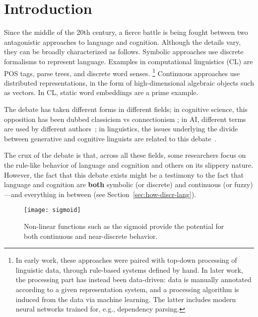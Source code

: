 \section{Introduction}

Since the middle of the 20th century, a fierce battle is being fought between two antagonistic approaches to language and cognition. Although the details vary, they can be broadly characterized as follows. Symbolic approaches use discrete formalisms to represent language. Examples in computational linguistics (CL) are POS tags, parse trees, and discrete word senses.
\footnote{In early work, these approaches were paired with top-down processing of linguistic data, through rule-based systems defined by hand. In later work, the processing part has instead been data-driven: data is manually annotated according to a given representation system, and a processing algorithm is induced from the data via machine learning. The latter includes modern neural networks trained for, e.g., dependency parsing.}
Continuous approaches use distributed representations, in the form of high-dimensional algebraic objects such as vectors. In CL, static word embeddings \cite[à la word2vec;][]{Mikolov2013skipgram} are a prime example.

The debate has taken different forms in different fields; in cognitive science, this opposition has been dubbed classicism vs connectionism \cite{sep-connectionism}; in AI, different terms are used by different authors~\cite{Russell2020}; in linguistics, the issues underlying the divide between generative and cognitive linguists are related to this debate~\citealp{harris1993linguistics}.

The crux of the debate is that, across all these fields, some researchers focus on the rule-like behavior of language and cognition and others on its slippery nature.
However, the fact that this debate exists might be a testimony to the fact that language and cognition are \textbf{both} symbolic (or discrete) and continuous (or fuzzy) ---and everything in between (see Section~\ref{sec:how-discr-lang}).

\begin{figure}[tb]
  \texttt{[image: sigmoid]}
  \caption{Non-linear functions such as the sigmoid provide the potential for both continuous and near-discrete behavior.}
  \label{fig:sigmoid}
\end{figure}

